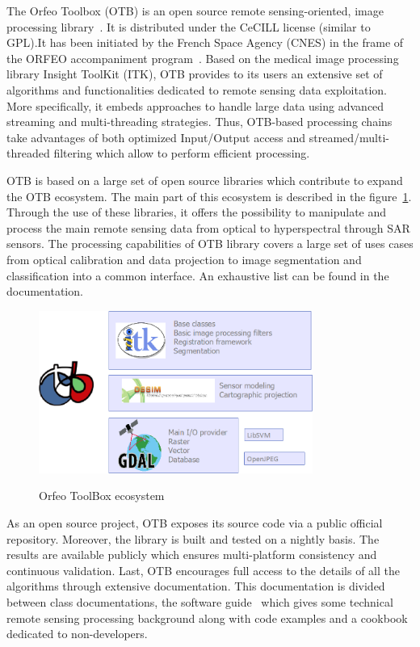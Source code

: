 \documentclass{josis}
\begin{document}
The Orfeo Toolbox (OTB) is an open source remote sensing-oriented, image
processing library~\cite{inglada2009orfeo}. It is distributed under the CeCILL
license (similar to GPL).It has been initiated by the French Space Agency (CNES)
in the frame of the ORFEO accompaniment program~\cite{tinel2012orfeo}. Based on
the medical image processing library Insight ToolKit (ITK), OTB provides to its
users an extensive set of algorithms and functionalities dedicated to remote
sensing data exploitation. More specifically, it embeds approaches to handle
large data using advanced streaming and multi-threading strategies. Thus,
OTB-based processing chains take advantages of both optimized Input/Output
access and streamed/multi-threaded filtering which allow to perform efficient
processing.

OTB is based on a large set of open source libraries which contribute to expand
the OTB ecosystem. The main part of this ecosystem is described in the
figure~\ref{fig:ecosystem}. Through the use of these libraries, it offers the
possibility to manipulate and process the main remote sensing data from optical
to hyperspectral through SAR sensors. The processing capabilities of OTB library
covers a large set of uses cases from optical calibration and data projection to
image segmentation and classification into a common interface. An exhaustive
list can be found in the documentation.

\begin{figure}[!htb]
\centering
\includegraphics[width=0.8\textwidth]{Pictures/otb_ecosystem}\label{fig:ecosystem}
\caption{Orfeo ToolBox ecosystem}
\end{figure}

As an open source project, OTB exposes its source code via a public
official repository. Moreover, the library is built and tested on a
nightly basis. The results are available publicly which ensures
multi-platform consistency and continuous validation. Last, OTB
encourages full access to the details of all the algorithms through
extensive documentation. This documentation is divided between class
documentations, the software guide~\cite{otbSoftwareGuide} which gives
some technical remote sensing processing background along with code
examples and a cookbook~\cite{otbCookBook} dedicated to non-developers.
\end{document}
